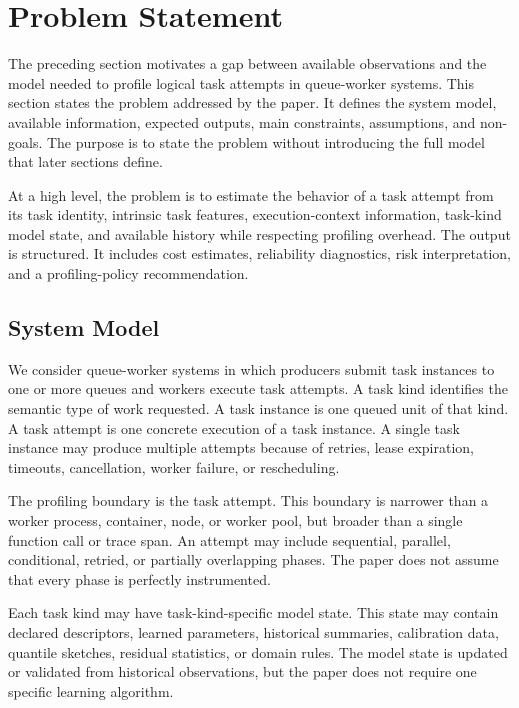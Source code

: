 \section{Problem Statement}
\label{sec:problem-statement}

The preceding section motivates a gap between available observations and the
model needed to profile logical task attempts in queue-worker systems. This
section states the problem addressed by the paper. It defines the system model,
available information, expected outputs, main constraints, assumptions, and
non-goals. The purpose is to state the problem without introducing the full model
that later sections define.

At a high level, the problem is to estimate the behavior of a task attempt from
its task identity, intrinsic task features, execution-context information,
task-kind model state, and available history while respecting profiling
overhead. The output is structured. It includes cost estimates, reliability
diagnostics, risk interpretation, and a profiling-policy recommendation.

\subsection{System Model}
\label{sec:problem-system-model}

We consider queue-worker systems in which producers submit task instances to one
or more queues and workers execute task attempts. A task kind identifies the
semantic type of work requested. A task instance is one queued unit of that kind.
A task attempt is one concrete execution of a task instance. A single task
instance may produce multiple attempts because of retries, lease expiration,
timeouts, cancellation, worker failure, or rescheduling.

The profiling boundary is the task attempt. This boundary is narrower than a
worker process, container, node, or worker pool, but broader than a single
function call or trace span. An attempt may include sequential, parallel,
conditional, retried, or partially overlapping phases. The paper does not assume
that every phase is perfectly instrumented.

Each task kind may have task-kind-specific model state. This state may contain
declared descriptors, learned parameters, historical summaries, calibration
data, quantile sketches, residual statistics, or domain rules. The model state
is updated or validated from historical observations, but the paper does not
require one specific learning algorithm.

